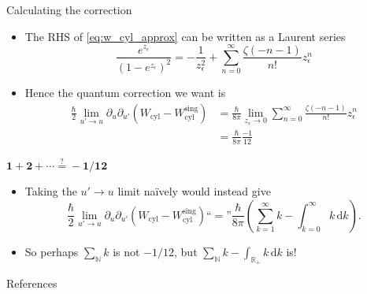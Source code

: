 \documentclass[pdf, fleqn, compress, handout]{beamer}
\begin{document}
\begin{frame}{Calculating the correction}
	\begin{itemize}
		\item	The RHS of \eqref{eq:w_cyl_approx} can be written as a Laurent series
				\begin{equation}					
					\frac{e^{z_\epsilon}}{(1 - e^{z_\epsilon})^2}
						=
					- \frac{1}{z_\epsilon^2}
					+ \sum_{n = 0}^\infty
							\frac{\zeta(-n - 1)}{n!} z_\epsilon^n
				\end{equation}
		\item	Hence the quantum correction we want is
				\begin{align*}
					\frac{\hbar}{2}
					\lim_{u' \to u}
					\partial_u \partial_{u'}
					\left(
						W_\mathrm{cyl} -
						W_\mathrm{cyl}^\mathrm{sing}
					\right)
					&	=
					\frac{\hbar}{8 \pi}
					\lim_{z_\epsilon \to 0}
						\sum_{n = 0}^\infty
							\frac{\zeta(-n - 1)}{n!} z_\epsilon^n 
						\\
					&	=
					\frac{\hbar}{8 \pi} \frac{-1}{12}
				\end{align*}
	\end{itemize}
\end{frame}

\begin{frame}{$\boldsymbol{1 + 2 + \cdots \overset{?}{=} -1/12}$}
	\begin{itemize}
		\item	Taking the $u' \to u$ limit na\"ively would instead give
				\begin{equation*}
					\frac{\hbar}{2}
					\lim_{u' \to u}
					\partial_u \partial_{u'}
					\left(
						W_\mathrm{cyl} -
						W_\mathrm{cyl}^\mathrm{sing}
					\right)
						\text{``} \! = \! \text{''}
					\frac{\hbar}{8\pi}
						\left( 
							\sum_{k = 1}^\infty k
								-
							\int_{k = 0}^\infty k \, \mathrm{d}k
						 \right).
				\end{equation*}
		\pause
		\item	So perhaps $\sum_\mathbb{N} k$ is not $-1 / 12$, but
				$\sum_\mathbb{N} k - \int_{\mathbb{R}_+} k \, \mathrm{d}k$ is!
	\end{itemize}
\end{frame}

\begin{nonavigation}
\appendix

\begin{frame}{References}
	\fontsize{8pt}{7.2}\selectfont
	
	
\end{frame}

\end{nonavigation}
\end{document}
